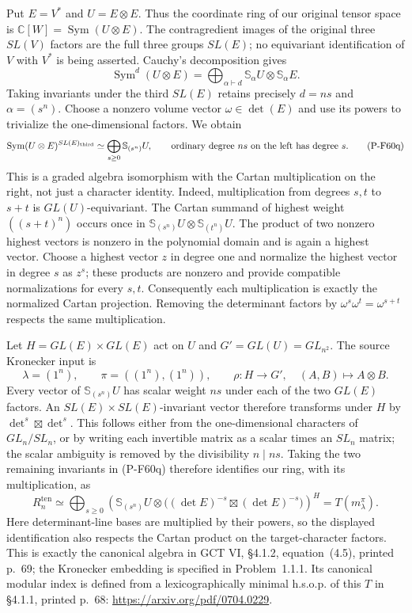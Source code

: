 Put $E=V^*$ and $U=E\otimes E$.  Thus the coordinate ring
of our original tensor space is
$\mathbb C[W]=\operatorname{Sym}(U\otimes E)$.
The contragredient images of the original three $SL(V)$
factors are the full three groups $SL(E)$; no equivariant
identification of $V$ with $V^*$ is being asserted.
Cauchy's decomposition gives
\[
 \operatorname{Sym}^{d}(U\otimes E)
     =\bigoplus_{\alpha\vdash d}
           \mathbb S_\alpha U\otimes\mathbb S_\alpha E.
\]
Taking invariants under the third $SL(E)$ retains precisely
$d=ns$ and $\alpha=(s^n)$.  Choose a nonzero volume vector
$\omega\in\det(E)$ and use its powers to trivialize the
one-dimensional factors.  We obtain
\[
 \operatorname{Sym}(U\otimes E)^{SL(E)_{\rm third}}
       \simeq \bigoplus_{s\ge0}\mathbb S_{(s^n)}U,
 \qquad \text{ordinary degree }ns\text{ on the left has degree }s.
                                                        \tag{P-F60q}
\]
This is a graded algebra isomorphism with the Cartan
multiplication on the right, not just a character identity.
Indeed, multiplication from degrees $s,t$ to $s+t$ is
$GL(U)$-equivariant.  The Cartan summand of highest weight
$((s+t)^n)$ occurs once in
$\mathbb S_{(s^n)}U\otimes\mathbb S_{(t^n)}U$.
The product of two nonzero highest vectors is nonzero in
the polynomial domain and is again a highest vector.
Choose a highest vector $z$ in degree one and normalize
the highest vector in degree $s$ as $z^s$; these products
are nonzero and provide compatible normalizations for
every $s,t$.  Consequently each multiplication is exactly
the normalized Cartan projection.  Removing the determinant
factors by $\omega^s\omega^t=\omega^{s+t}$ respects the
same multiplication.

Let $H=GL(E)\times GL(E)$ act on $U$ and
$G'=GL(U)=GL_{n^2}$.  The source Kronecker input is
\[
       \lambda=(1^n),\qquad
       \pi=((1^n),(1^n)),\qquad
       \rho:H\longrightarrow G',\quad(A,B)\longmapsto A\otimes B.
                                                        \tag{P-F60r}
\]
Every vector of $\mathbb S_{(s^n)}U$ has scalar weight
$ns$ under each of the two $GL(E)$ factors.
An $SL(E)\times SL(E)$-invariant vector therefore
transforms under $H$ by $\det^s\boxtimes\det^s$.
This follows either from the one-dimensional characters
of $GL_n/SL_n$, or by writing each invertible matrix as
a scalar times an $SL_n$ matrix; the scalar ambiguity
is removed by the divisibility $n\mid ns$.
Taking the two remaining invariants in (P-F60q) therefore
identifies our ring, with its multiplication, as
\[
 R^{\mathrm{ten}}_n\simeq
 \bigoplus_{s\ge0}
 \left(\mathbb S_{(s^n)}U\otimes
       \bigl((\det E)^{-s}\boxtimes(\det E)^{-s}\bigr)\right)^H
       =T(m_\lambda^\pi).
                                                        \tag{P-F60s}
\]
Here determinant-line bases are multiplied by their powers,
so the displayed identification also respects the Cartan
product on the target-character factors.
This is exactly the canonical algebra in GCT VI,
\S4.1.2, equation~(4.5), printed p.~69; the Kronecker
embedding is specified in Problem~1.1.1.  Its canonical
modular index is defined from a lexicographically minimal
h.s.o.p. of this $T$ in \S4.1.1, printed p.~68:
\url{https://arxiv.org/pdf/0704.0229}.

